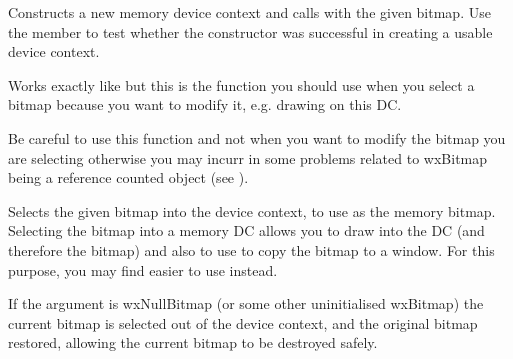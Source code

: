 Constructs a new memory device context and calls 
with the given bitmap.
Use the  member to test whether the constructor was successful
in creating a usable device context.


\label{wxmemorydcselectobject}


Works exactly like  but
this is the function you should use when you select a bitmap because you want to modify
it, e.g. drawing on this DC.

Be careful to use this function and not 
when you want to modify the bitmap you are selecting otherwise you may incurr in some
problems related to wxBitmap being a reference counted object
(see ).





\label{wxmemorydcselectobjectassource}


Selects the given bitmap into the device context, to use as the memory
bitmap. Selecting the bitmap into a memory DC allows you to draw into
the DC (and therefore the bitmap) and also to use  to copy
the bitmap to a window. For this purpose, you may find \rtfsp
easier to use instead.

If the argument is wxNullBitmap (or some other uninitialised wxBitmap) the current bitmap is
selected out of the device context, and the original bitmap restored, allowing the current bitmap to
be destroyed safely.



